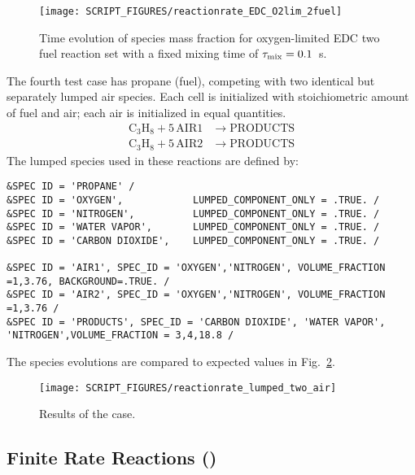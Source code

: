 \documentclass[11pt]{book}
\begin{document}
\begin{figure}[!ht]
\centering
\texttt{[image: SCRIPT\_FIGURES/reactionrate\_EDC\_O2lim\_2fuel]}
\caption[Species evolution in two parallel EDC reactions]{Time evolution of species mass fraction for oxygen-limited EDC two fuel reaction set with a fixed mixing time of $\tau_{\rm mix}=0.1$~s.}
\label{fig:EDC_2Step_ox}
\end{figure}

The fourth test case has propane (fuel), competing with two identical but separately lumped air species. Each cell is initialized with stoichiometric amount of fuel and air; each air is initialized in equal quantities.
\begin{align}\label{eq:lumped_2_air}
\mathrm{C_3H_8 + 5 \, AIR1} &\rightarrow  \mathrm{PRODUCTS} \\
\nonumber \mathrm{C_3H_8 + 5 \, AIR2} &\rightarrow \mathrm{PRODUCTS}
\end{align}
The lumped species used in these reactions are defined by:
\begin{lstlisting}
&SPEC ID = 'PROPANE' /
&SPEC ID = 'OXYGEN',            LUMPED_COMPONENT_ONLY = .TRUE. /
&SPEC ID = 'NITROGEN',          LUMPED_COMPONENT_ONLY = .TRUE. /
&SPEC ID = 'WATER VAPOR',       LUMPED_COMPONENT_ONLY = .TRUE. /
&SPEC ID = 'CARBON DIOXIDE',    LUMPED_COMPONENT_ONLY = .TRUE. /

&SPEC ID = 'AIR1', SPEC_ID = 'OXYGEN','NITROGEN', VOLUME_FRACTION =1,3.76, BACKGROUND=.TRUE. /
&SPEC ID = 'AIR2', SPEC_ID = 'OXYGEN','NITROGEN', VOLUME_FRACTION =1,3.76 /
&SPEC ID = 'PRODUCTS', SPEC_ID = 'CARBON DIOXIDE', 'WATER VAPOR', 'NITROGEN',VOLUME_FRACTION = 3,4,18.8 /
\end{lstlisting}
The species evolutions are compared to expected values in Fig.~\ref{fig:reactionrate_lumped_two_air}.
\begin{figure}[!ht]
\centering
\texttt{[image: SCRIPT\_FIGURES/reactionrate\_lumped\_two\_air]}
\caption[Results of the  case]{Results of the  case.}
\label{fig:reactionrate_lumped_two_air}
\end{figure}



\FloatBarrier

\subsection{Finite Rate Reactions (\texorpdfstring{}{reactionrate\_arrhenius})}
\label{finite_rate_reactions}
\label{reactionrate_arrhenius_equilibrium}
\label{reactionrate_arrhenius_equilibrium_cvode}
\label{reactionrate_arrhenius_0order_1step}
\label{reactionrate_arrhenius_0order_1step_cvode}
\label{reactionrate_arrhenius_2order_1step}
\label{reactionrate_arrhenius_2order_1step_cvode}
\label{reactionrate_arrhenius_1p75order_2step}
\label{reactionrate_arrhenius_1p75order_2step_cvode}
\label{reactionrate_arrhenius_1p75order_2stepr}
\label{reactionrate_arrhenius_1p75order_2stepr_cvode}
\label{reactionrate_arrhenius_jones_lindstedt}
\label{reactionrate_arrhenius_jones_lindstedt_cvode}
\end{document}
